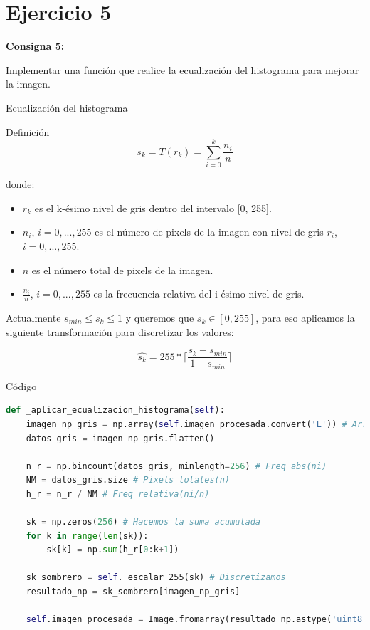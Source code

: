 \documentclass{beamer}
\begin{document}
\section{Ejercicio 5}

\begin{frame}
	\begin{center}
		\textcolor{unahurverde}{\textbf{Consigna 5:}}
	\end{center}
	\justifying
	
	Implementar una función que realice la ecualización del histograma para mejorar la imagen.
\end{frame}

\begin{frame}[fragile]{Ecualización del histograma}
	\justifying
	
	\begin{block}{Definición}
		\[
		s_k = T(r_k) = \sum_{i=0}^{k} \frac{n_i}{n}
		\]
	\end{block}
	
	donde:
	
	\begin{itemize}
		\item $r_k$ es el k-ésimo nivel de gris dentro del intervalo [0, 255].
		\item $n_i$, $i=0,...,255$ es el número de pixels de la imagen con nivel de gris $r_i$, $i=0,...,255$.
		\item $n$ es el número total de pixels de la imagen.
		\item $\frac{n_i}{n}$, $i=0,...,255$ es la frecuencia relativa del i-ésimo nivel de gris.
	\end{itemize}
	
	Actualmente $s_{min} \leq s_k \leq 1$ y queremos que $s_k \in [0, 255]$, para eso aplicamos la siguiente transformación para discretizar los valores:
	
	\[
	\hat{s_k} = 255 * \lceil \frac{s_k - s_{min}}{1 - s_{min}} \rceil
	\]
\end{frame}

\begin{frame}[fragile]{Código}
	\justifying
	
	\begin{lstlisting}[language=Python]
def _aplicar_ecualizacion_histograma(self):
	imagen_np_gris = np.array(self.imagen_procesada.convert('L')) # Array de la forma (m. n).
	datos_gris = imagen_np_gris.flatten()
	
	n_r = np.bincount(datos_gris, minlength=256) # Freq abs(ni)
	NM = datos_gris.size # Pixels totales(n)
	h_r = n_r / NM # Freq relativa(ni/n)
	
	sk = np.zeros(256) # Hacemos la suma acumulada
	for k in range(len(sk)):
		sk[k] = np.sum(h_r[0:k+1])
	
	sk_sombrero = self._escalar_255(sk) # Discretizamos
	resultado_np = sk_sombrero[imagen_np_gris]
	
	self.imagen_procesada = Image.fromarray(resultado_np.astype('uint8')).convert('RGB')
	\end{lstlisting}
\end{frame}
\end{document}

